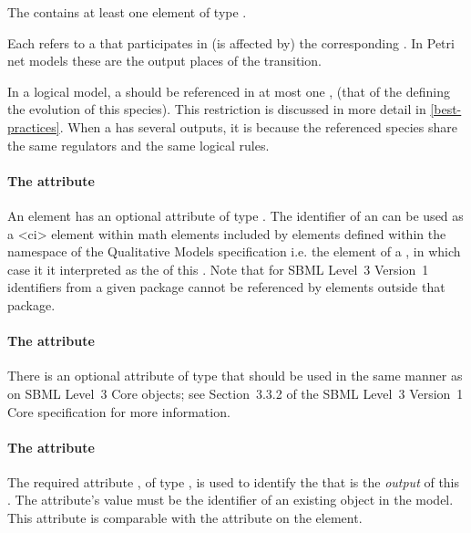 The \ListOfOutputs contains at least one element of type \Output. 

Each \Output refers to a \QualitativeSpecies that participates in (is affected by) the corresponding \Transition.  In Petri net models these are the output places of the transition.  

\pagebreak
In a logical model, a \QualitativeSpecies should be referenced in at most one \ListOfOutputs, (that of the \Transition defining the evolution of this species). This restriction is discussed in more detail in \ref{best-practices}. When a \Transition has several outputs, it is because the referenced species share the same regulators and the same logical rules.




\paragraph{The  attribute}
An \Output element has an optional  attribute of type .  The identifier of an \Output can be used as a 
<ci> element within 
math elements included by elements defined within the namespace of the Qualitative Models specification i.e. the  element of a \FunctionTerm, in which case it it interpreted as the  of this \Output. Note that for SBML Level~3 Version~1 identifiers from a given package cannot be referenced by elements outside that package. 

\paragraph{The  attribute}
There is an optional  attribute of type  that should be used
in the same manner as on SBML Level~3 Core
objects; see Section~3.3.2 of the SBML Level~3 Version~1 Core
specification for more information.



\paragraph{The  attribute}
The required attribute , of type , is used to identify the \QualitativeSpecies that is the \emph{output} of this \Transition.  The attribute's value must be the identifier of an existing \QualitativeSpecies object in the model.  This attribute is comparable with the  attribute on the  element.

